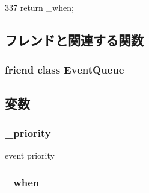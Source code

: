 \begin{DoxyCode}
337 { return _when; }
\end{DoxyCode}


\subsection{フレンドと関連する関数}
\hypertarget{classEvent_a3b1787a64e5e97ce075c05a58303d58c}{
\subsubsection[{EventQueue}]{\setlength{\rightskip}{0pt plus 5cm}friend class {\bf EventQueue}}}
\label{classEvent_a3b1787a64e5e97ce075c05a58303d58c}


\subsection{変数}
\hypertarget{classEvent_a4c36d25baa2cdb3ae10202e51702b93d}{
\subsubsection[{\_\-priority}]{ {\bf \_\-priority}}}
\label{classEvent_a4c36d25baa2cdb3ae10202e51702b93d}


event priority \hypertarget{classEvent_a252ba7479c9d9519c6879cd5c297d54c}{
\subsubsection[{\_\-when}]{ {\bf \_\-when}}}
\label{classEvent_a252ba7479c9d9519c6879cd5c297d54c}


